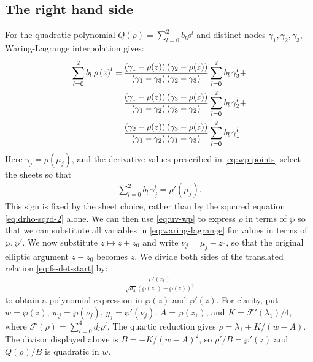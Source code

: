 \documentclass[11pt,a4paper]{article}
\numberwithin{equation}{section}
\begin{document}
\subsection{The right hand side}
For the quadratic polynomial $Q(\rho)=\sum_{l=0}^{2}b_l\rho^l$ and distinct nodes $\gamma_1,\gamma_2,\gamma_3$, Waring-Lagrange interpolation gives:
\begin{align}
\sum_{l=0}^{2}b_l\,\rho\left(z\right)^l =\, &\frac{\left({\gamma}_{1} - \rho{\left(z \right)}\right) \left({\gamma}_{2} - \rho{\left(z \right)}\right)}{\left({\gamma}_{1} - {\gamma}_{3}\right) \left({\gamma}_{2} - {\gamma}_{3}\right)} \sum\limits_{l=0}^{2}b_l\,\gamma_3^l + \notag \\
&\frac{\left({\gamma}_{1} - \rho{\left(z \right)}\right) \left({\gamma}_{3} - \rho{\left(z \right)}\right)}{\left({\gamma}_{1} - {\gamma}_{2}\right) \left({\gamma}_{3} - {\gamma}_{2}\right)} \sum\limits_{l=0}^{2}b_l\,\gamma_2^l + \notag \\
&\frac{\left({\gamma}_{2} - \rho{\left(z \right)}\right) \left({\gamma}_{3} - \rho{\left(z \right)}\right)}{\left({\gamma}_{1} - {\gamma}_{2}\right) \left({\gamma}_{1} - {\gamma}_{3}\right)} \sum\limits_{l=0}^{2}b_l\,\gamma_1^l \label{eq:waring-lagrange}
\end{align}
Here $\gamma_j=\rho(\mu_j)$, and the derivative values prescribed in \eqref{eq:wp-points} select the sheets so that
\begin{align}
\sum\limits_{l=0}^{2}b_l\,\gamma_j^l = \rho'\left(\mu_j\right).
\end{align}
This sign is fixed by the sheet choice, rather than by the squared equation \eqref{eq:drho-sqrd-2} alone.
We can then use \eqref{eq:uv-wp} to express $\rho$ in terms of $\wp$ so that we can substitute all variables in \eqref{eq:waring-lagrange} for values in terms of $\wp, \wp'$.
We now substitute $z\mapsto z+z_0$ and write $\nu_j=\mu_j-z_0$, so that the original elliptic argument $z-z_0$ becomes $z$.
We divide both sides of the translated relation \eqref{eq:fs-det-start} by:
\begin{align}
\frac{\wp'{\left(z_{1}\right)}}{\sqrt{{d}_{4}} \left(\wp{\left(z_{1}\right)} - \wp{\left(z\right)}\right)^2 }
\end{align}
to obtain a polynomial expression in $\wp(z)$ and $\wp'(z)$.
For clarity, put $w=\wp(z)$, $w_j=\wp(\nu_j)$, $y_j=\wp'(\nu_j)$,
$A=\wp(z_1)$, and $K=\mathcal F'(\lambda_1)/4$, where $\mathcal F(\rho)=\sum_{l=0}^4d_l\rho^l$.
The quartic reduction gives $\rho=\lambda_1+K/(w-A)$.
The divisor displayed above is $B=-K/(w-A)^2$, so $\rho'/B=\wp'(z)$ and $Q(\rho)/B$ is quadratic in $w$.
\end{document}
